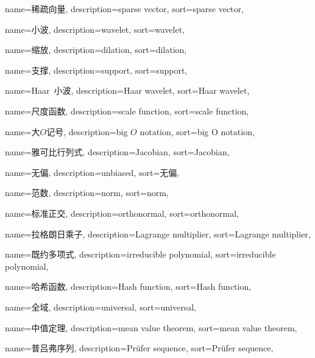 {
	name=稀疏向量,
	description={sparse vector},
	sort={sparse vector},
}

{
	name=小波,
	description={wavelet},
	sort={wavelet},
}

{
	name=缩放,
	description={dilation},
	sort={dilation},
}

{
	name=支撑,
	description={support},
	sort={support},
}

{
	name=Haar~小波,
	description={Haar wavelet},
	sort={Haar wavelet},
}

{
	name=尺度函数,
	description={scale function},
	sort={scale function},
}


{
	name=大$O$记号,
	description={big $O$ notation},
	sort={big O notation},
}

{
	name=雅可比行列式,
	description={Jacobian},
	sort={Jacobian},
}

{
	name=无偏,
	description={unbiased},
	sort={无偏},
}


{
	name=范数,
	description={norm},
	sort={norm},
}

{
	name=标准正交,
	description={orthonormal},
	sort={orthonormal},
}

{
	name=拉格朗日乘子,
	description={Lagrange multiplier},
	sort={Lagrange multiplier},
}

{
	name=既约多项式,
	description={irreducible polynomial},
	sort={irreducible polynomial},
}

{
	name=哈希函数,
	description={Hash function},
	sort={Hash function},
}

{
	name=全域,
	description={universal},
	sort={universal},
}

{
	name=中值定理,
	description={mean value theorem},
	sort={mean value theorem},
}

{
	name=普吕弗序列,
	description={Pr\"ufer sequence},
	sort={Pr\"ufer sequence},
}
